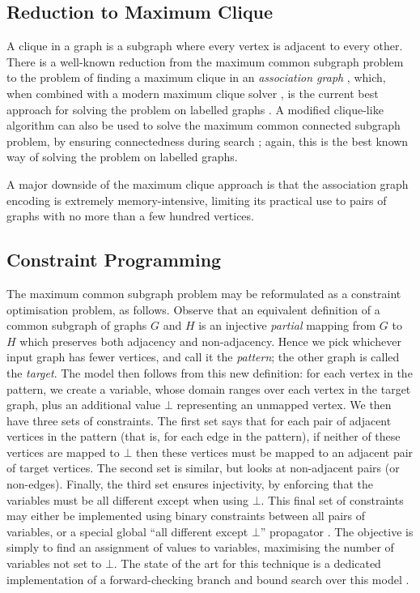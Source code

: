 \documentclass[sigconf]{acmart}
\begin{document}
\subsection{Reduction to Maximum Clique}

A clique in a graph is a subgraph where every vertex is adjacent to every other. There is a
well-known reduction from the maximum common subgraph problem to the problem of finding a maximum
clique in an \emph{association graph}
\citep{o:Levi73,DBLP:journals/siamcomp/BalasY86,o:DurandPBT99,DBLP:journals/jcamd/RaymondW02a,DBLP:conf/cp/McCreeshNPS16}, which, when combined with
a modern maximum clique solver \citep{DBLP:journals/ol/SegundoMRH13}, is the current best approach for
solving the problem on labelled graphs \citep{DBLP:conf/cp/McCreeshNPS16}. A modified clique-like
algorithm can also be used to solve the maximum common connected subgraph problem, by ensuring
connectedness during search \citep{DBLP:conf/cp/McCreeshNPS16}; again, this is the best known way of
solving the problem on labelled graphs.

A major downside of the maximum clique approach is that the association graph encoding is extremely
memory-intensive, limiting its practical use to pairs of graphs with no more than a few hundred
vertices.

\subsection{Constraint Programming}

The maximum common subgraph problem may be reformulated as a constraint optimisation problem, as
follows.  Observe that an equivalent definition of a common subgraph of graphs $G$ and $H$ is an
injective \emph{partial} mapping from $G$ to $H$ which preserves both adjacency and non-adjacency.
Hence we pick whichever input graph has fewer vertices, and call it the \emph{pattern}; the other
graph is called the \emph{target}. The model then follows from this new definition: for each vertex
in the pattern, we create a variable, whose domain ranges over each vertex in the target graph, plus
an additional value $\bot$ representing an unmapped vertex. We then have three sets of constraints.
The first set says that for each pair of adjacent vertices in the pattern (that is, for each edge in
the pattern), if neither of these vertices are mapped to $\bot$ then these vertices must be mapped
to an adjacent pair of target vertices. The second set is similar, but looks at non-adjacent pairs
(or non-edges).  Finally, the third set ensures injectivity, by enforcing that the variables must be
all different except when using $\bot$. This final set of constraints may either be implemented
using binary constraints between all pairs of variables, or a special global ``all different except
$\bot$'' propagator \citep{DBLP:conf/cp/PetitRB01}. The objective is simply to find an assignment of
values to variables, maximising the number of variables not set to $\bot$. The state of the art for
this technique is a dedicated implementation of a forward-checking branch and bound search over this
model \citep{DBLP:conf/cp/NdiayeS11,DBLP:conf/cp/McCreeshNPS16}.
\end{document}
